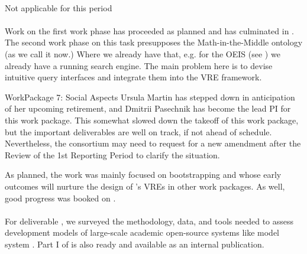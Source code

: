 \documentclass{deliverablereport}
\makeatletter
\renewcommand\subsubsection{\@startsection{subsubsection}{2}%
  \z@{.5\linespacing\@plus.7\linespacing}{.1\linespacing}%
  {\normalfont\bfseries}}
\makeatother
\begin{document}
  \paragraph{}
  Not applicable for this period
  
  \paragraph{}
  Work on the first work phase has proceeded as planned and has culminated in
  . The second work phase on this task presupposes the
  Math-in-the-Middle ontology (as we call it now.) Where we already have that, e.g. for
  the OEIS (see ) we already have a running search
  engine. The main problem here is to devise intuitive query interfaces and integrate them
  into the \pn VRE framework.

\clearpage
  \subsubsection{WorkPackage 7: Social Aspects}
  \label{social-aspects}
  Ursula Martin has stepped down in anticipation of her upcoming retirement, and Dmitrii
  Pasechnik has become the lead PI for this work package.  This somewhat slowed down the
  takeoff of this work package, but the important deliverables are well on track, if not
  ahead of schedule. Nevertheless, the consortium may need to request for a new amendment
  after the Review of the 1st Reporting Period to clarify the situation.

  As planned, the work was mainly focused on bootstrapping
   and
   whose early outcomes will nurture
  the design of \ODK's VREs in other work packages. As well, good progress was booked
  on  .

  \paragraph{} %
  For deliverable ,
  we surveyed the methodology, data, and tools needed to assess
  development models of large-scale academic open-source systems
  like model system \Sage.
  Part I of  is also ready and available
  as an internal publication.
\end{document}
